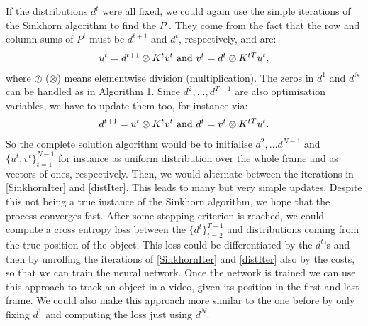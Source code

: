 \documentclass{article}
\begin{document}
{If the distributions $d^t$ were all fixed, we could again use the simple iterations of the Sinkhorn algorithm \cite{Sink67} to find the $P^t$. They come from the fact that the row and column sums of $P^t$ must be $d^{t+1}$ and $d^t$, respectively, and are:
\begin{align}\label{SinkhornIter}
u^t = d^{t+1} \oslash K^t v^t \textnormal{ and } v^t = d^t \oslash K^{tT} u^t,
\end{align}
where $\oslash$ ($\otimes$) means elementwise division (multiplication). The zeros in $d^1$ and $d^N$ can be handled as in \cite{Cut13} Algorithm 1. Since $d^2, \dots, d^{T-1}$ are also optimisation variables, we have to update them too, for instance via:
\begin{align}\label{distIter}
d^{t+1} = u^t \otimes K^t v^t \textnormal{ and } d^t = v^t \otimes K^{tT} u^t.
\end{align}
So the complete solution algorithm would be to initialise $d^2, \dots d^{N-1}$ and $\{u^t, v^t\}_{t=1}^{N-1}$ for instance as uniform distribution over the whole frame and as vectors of ones, respectively. Then, we would alternate between the iterations in \eqref{SinkhornIter} and \eqref{distIter}. This leads to many but very simple updates. Despite this not being a true instance of the Sinkhorn algorithm, we hope that the process converges fast. After some stopping criterion is reached, we could compute a cross entropy loss between the $\{d^t\}_{t=2}^{T-1}$ and distributions coming from the true position of the object. This loss could be differentiated by the $d^t$'s and then by unrolling the iterations of \eqref{SinkhornIter} and \eqref{distIter} also by the costs, so that we can train the neural network. Once the network is trained we can use this approach to track an object in a video, given its position in the first and last frame. We could also make this approach more similar to the one before by only fixing $d^1$ and computing the loss just using $d^N$.

}
\end{document}
